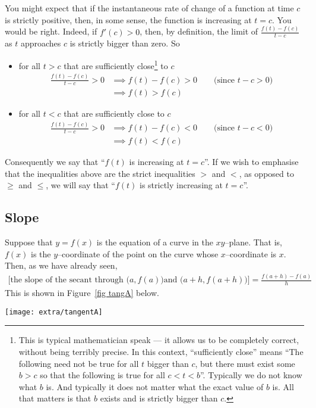 You might expect that if the instantaneous rate of change of a function at  
time $c$ is strictly positive, then, in some sense, the function is 
increasing at $t=c$. You would be right. Indeed, if $f'(c)>0$, then, by definition, the limit of $\frac{f(t)-f(c)}{t-c}$ as $t$ approaches $c$ is strictly bigger than zero. So 
\begin{itemize}
\item
for all $t>c$ that are sufficiently close\footnote{This is typical mathematician speak --- it allows us to be completely correct, without 
being terribly precise. In this context, ``sufficiently close'' means ``The following need not be true for all $t$ bigger than $c$, but there must 
exist some $b>c$ so that the following is true for all $c<t<b$''. Typically
we do not know what $b$ is. And typically it does not matter what the 
exact value of $b$ is. All that matters is that $b$ exists and is 
strictly bigger than $c$.} to $c$
  \begin{align*}
         \frac{f(t)-f(c)}{t-c}>0
          & \implies f(t)-f(c) > 0\qquad \text{(since $t-c>0$)} \\
          & \implies f(t)>f(c)
  \end{align*}
\item 
for all $t<c$ that are sufficiently close to $c$
   \begin{align*}
         \frac{f(t)-f(c)}{t-c}>0
          & \implies f(t)-f(c) < 0\qquad \text{(since $t-c<0$)} \\
          & \implies f(t)<f(c)
  \end{align*}
\end{itemize}
Consequently we say that ``$f(t)$ is increasing at $t=c$''. If we wish
to emphasise that the inequalities above are the strict inequalities
$>$ and $<$, as opposed to $\ge$ and $\le$, we will say that
``$f(t)$ is strictly increasing at $t=c$''.


\subsection*{Slope}

Suppose that $y=f(x)$ is the equation of a curve in the $xy$--plane.
That is, $f(x)$ is the $y$--coordinate of the point on the curve whose
$x$--coordinate is $x$. Then, as we have already seen,
\begin{align*}
\big[\text{the slope of the secant through $\big(a,f(a)\big)$
       and $\big(a+h,f(a+h)\big)$}\big]
=\frac{f(a+h)-f(a)}{h}
\end{align*}
This is shown in Figure~\ref{fig tangA} below.
\begin{fig}\label{fig tangA}
  \begin{center}
  \texttt{[image: extra/tangentA]}
  \end{center}
\end{fig}

